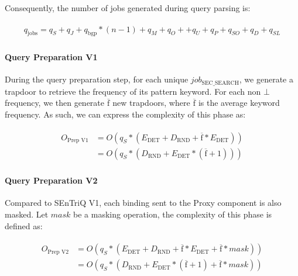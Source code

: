 Consequently, the number of jobs generated during query parsing is:

\begin{align}
    \label{equation:query-parsing}
    \begin{split}
        q_{\text{jobs}} = q_S + q_J + q_{\text{bgp}} * (n - 1) + q_M + q_O+ + q_U + q_P+ q_{SO} + q_D + q_{SL}
    \end{split}
\end{align}

\paragraph{Query Preparation V1} During the query preparation step, for each unique \linebreak$job_{\text{SEC\_SEARCH}}$, we generate a trapdoor to retrieve the frequency of its pattern keyword. For each non $\bot$ frequency, we then generate $\overline{\text{f}}$ new trapdoors, where $\overline{\text{f}}$ is the average keyword frequency. As such, we can express the complexity of this phase as:

\begin{align}
    \label{equation:query-preparation-v1}
    \begin{split}
        O_{\text{Prep V1}} &= O \left( q_S * (E_{\text{DET}} + D_{\text{RND}} + \overline{\text{f}} * E_{\text{DET}})\right) \\
        &= O \left( q_S * (D_{\text{RND}} + E_{\text{DET}} * (\overline{\text{f}} + 1))\right)
    \end{split}
\end{align}

\paragraph{Query Preparation V2} Compared to \gls{SEnTriQ} V1, each binding sent to the Proxy component is also masked. Let $mask$ be a masking operation, the complexity of this phase is defined as:

\begin{align}
    \label{equation:query-preparation-v2}
    \begin{split}
        O_{\text{Prep V2}} &= O \left( q_S * (E_{\text{DET}} + D_{\text{RND}} + \overline{\text{f}} * E_{\text{DET}} + \overline{\text{f}} * mask)\right) \\
        &= O \left( q_S * (D_{\text{RND}} + E_{\text{DET}} * (\overline{\text{f}} + 1) + \overline{\text{f}} * mask)\right)
    \end{split}
\end{align}

